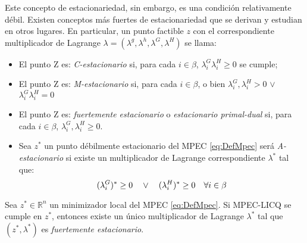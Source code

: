 Este concepto de estacionariedad, sin embargo, es una condición relativamente débil. Existen conceptos más fuertes de estacionariedad que se derivan y estudian en otros lugares. En particular, un punto factible $z$ con el correspondiente multiplicador de Lagrange $\lambda = (\lambda^g, \lambda^h, \lambda^G, \lambda^H)$ se llama:

\begin{itemize}
\item \begin{definition}
  El punto Z es: \textit{C-estacionario} si, para cada $i \in \beta$, $\lambda_i^G\lambda_i^H \geq 0$ se cumple;
\end{definition}
\item \begin{definition}
    El punto Z es: \textit{M-estacionario} si, para cada $i \in \beta$, o bien $\lambda_i^G,\lambda_i^H > 0$ $\vee$ $\lambda_i^G \lambda_i^H = 0$
\end{definition}
\item \begin{definition}
    El punto Z es: \textit{fuertemente estacionario} o \textit{estacionario primal-dual} si, para cada $i \in \beta$, $\lambda_i^G, \lambda_i^H \geq 0$.
\end{definition}
\item \begin{definition}
   Sea $z^*$ un punto débilmente estacionario del MPEC \eqref{eq:DefMpec} será \textit{A-estacionario} si existe un multiplicador de Lagrange correspondiente $\lambda^*$ tal que:
\begin{equation}
(\lambda_i^G)^* \geq 0 \quad \vee \quad (\lambda_i^H)^* \geq 0 \quad \forall i \in \beta \notag
\end{equation}
\end{definition}
\end{itemize}


\begin{theorem} 
Sea $z^* \in \mathbb{R}^n$ un minimizador local del MPEC \eqref{eq:DefMpec}. Si MPEC-LICQ se cumple en $z^*$, entonces existe un único multiplicador de Lagrange $\lambda^*$ tal que $(z^*, \lambda^*)$ es \textit{fuertemente estacionario}.
\end{theorem}

